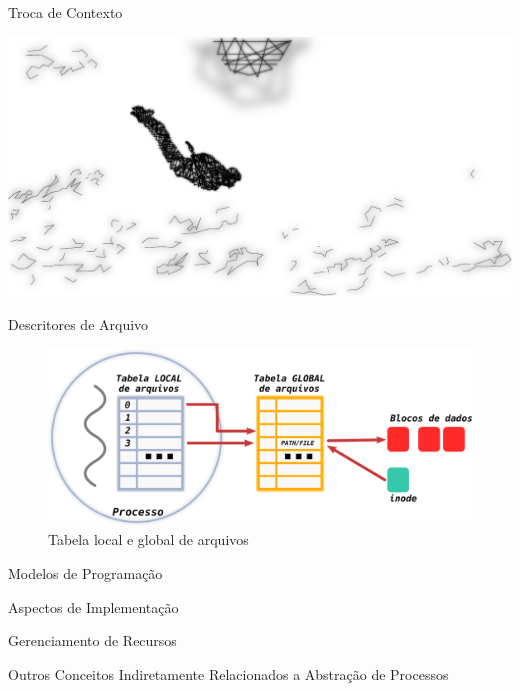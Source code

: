 \documentclass[xcolor={usenames,svgnames,dvipsnames},brazil,english,12pt,aspectratio=149]{beamer}
\begin{document}
\begin{frame}{Troca de Contexto}
\end{frame}

\begin{frame}[plain]
  \includegraphics[width=\textwidth]{presentation_sec_five}
\end{frame}

\begin{frame}{Descritores de Arquivo}
	\begin{figure}[!h]
		\centering
		\includegraphics[width=.70\textwidth]{descritores} 
		\caption{Tabela local e global de arquivos}
		\label{fig:descritores} 
	\end{figure}
\end{frame}

\begin{frame}{Modelos de Programação}
\end{frame}

\begin{frame}{Aspectos de Implementação}
\end{frame}

\begin{frame}{Gerenciamento de Recursos}
\end{frame}

\begin{frame}{Outros Conceitos Indiretamente Relacionados a Abstração de Processos}
\end{frame}
\end{document}
